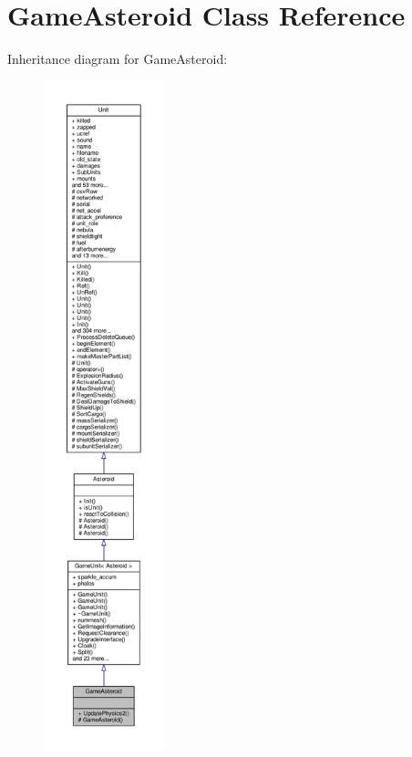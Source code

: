 \hypertarget{classGameAsteroid}{}\section{Game\+Asteroid Class Reference}
\label{classGameAsteroid}


Inheritance diagram for Game\+Asteroid\+:
\nopagebreak
\begin{figure}[H]
\begin{center}
\leavevmode
\includegraphics[height=550pt]{dc/dfc/classGameAsteroid__inherit__graph}
\end{center}
\end{figure}


